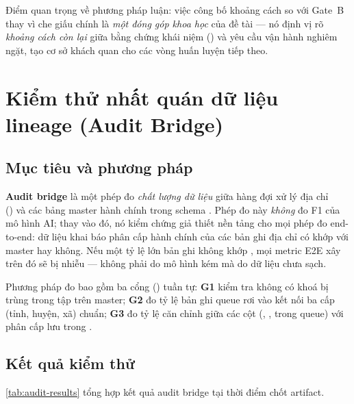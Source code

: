Điểm quan trọng về phương pháp luận: việc công bố khoảng cách so với Gate~B thay vì che giấu chính là \emph{một đóng góp khoa học} của đề tài --- nó định vị rõ \emph{khoảng cách còn lại} giữa bằng chứng khái niệm () và yêu cầu vận hành nghiêm ngặt, tạo cơ sở khách quan cho các vòng huấn luyện tiếp theo.

\section{Kiểm thử nhất quán dữ liệu lineage (Audit Bridge)}
\label{sec:exp-audit}

\subsection{Mục tiêu và phương pháp}
\label{sec:exp-audit-method}

\textbf{Audit bridge} là một phép đo \emph{chất lượng  dữ liệu} giữa hàng đợi xử lý địa chỉ \\() và các bảng master hành chính trong schema . Phép đo này \emph{không} đo F1 của mô hình AI; thay vào đó, nó kiểm chứng giả thiết nền tảng cho mọi phép đo end-to-end: dữ liệu khai báo phân cấp hành chính của các bản ghi địa chỉ có khớp với master hay không. Nếu một tỷ lệ lớn bản ghi không khớp , mọi metric E2E xây trên đó sẽ bị nhiễu --- không phải do mô hình kém mà do dữ liệu chưa sạch.

Phương pháp đo bao gồm ba cổng () tuần tự: \textbf{G1} kiểm tra không có khoá  bị trùng trong tập  trên master; \textbf{G2} đo tỷ lệ bản ghi queue rơi vào kết nối  ba cấp (tỉnh, huyện, xã) chuẩn; \textbf{G3} đo tỷ lệ căn chỉnh giữa các cột  (, ,  trong queue) với phân cấp lưu trong .

\subsection{Kết quả kiểm thử}
\label{sec:exp-audit-results}

\cref{tab:audit-results} tổng hợp kết quả audit bridge tại thời điểm chốt artifact.

